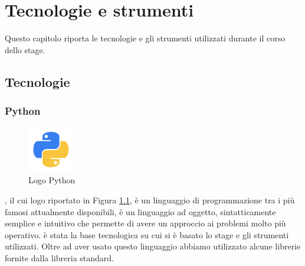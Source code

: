 
\hypertarget{(chap:capitolo6)}{}
\chapter{Tecnologie e strumenti}
Questo capitolo riporta le tecnologie e gli strumenti utilizzati durante il corso dello stage.
\section{Tecnologie}
\subsection{Python}
\begin{figure}[H]
	\begin{center} \includegraphics[width=2cm]{figures/python}
		\caption[Logo Python]{Logo Python} 
		\label{logo_python} 
	\end{center}
\end{figure}
, il cui logo riportato in Figura \ref{logo_python}, è un linguaggio di programmazione tra i più famosi attualmente disponibili, è un linguaggio ad oggetto, sintatticamente semplice e intuitivo che permette di avere un approccio ai problemi molto più operativo.  è stata la base tecnologica su cui si è basato lo stage e gli strumenti utilizzati. Oltre ad aver usato questo linguaggio abbiamo utilizzato alcune librerie fornite dalla libreria standard.


